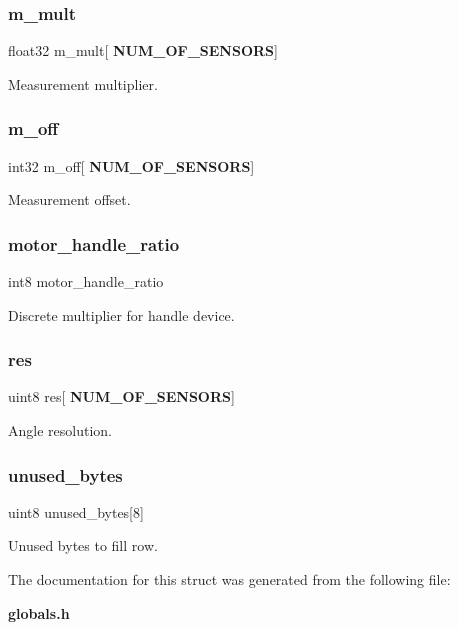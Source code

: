 \subsubsection{m\+\_\+mult}
{\footnotesize\ttfamily float32 m\+\_\+mult[\textbf{ N\+U\+M\+\_\+\+O\+F\+\_\+\+S\+E\+N\+S\+O\+RS}]}

Measurement multiplier. \mbox{\label{structst__encoder_ab544f035124be893918bafb611fe88d9}} 
\subsubsection{m\+\_\+off}
{\footnotesize\ttfamily int32 m\+\_\+off[\textbf{ N\+U\+M\+\_\+\+O\+F\+\_\+\+S\+E\+N\+S\+O\+RS}]}

Measurement offset. \mbox{\label{structst__encoder_a098badbb74d31ea6257e57f6d66823cc}} 
\subsubsection{motor\+\_\+handle\+\_\+ratio}
{\footnotesize\ttfamily int8 motor\+\_\+handle\+\_\+ratio}

Discrete multiplier for handle device. \mbox{\label{structst__encoder_ac2e19d167eac4c8ca9ce97c646e78595}} 
\subsubsection{res}
{\footnotesize\ttfamily uint8 res[\textbf{ N\+U\+M\+\_\+\+O\+F\+\_\+\+S\+E\+N\+S\+O\+RS}]}

Angle resolution. \mbox{\label{structst__encoder_ab2479545d632531da12aab41325a8d8f}} 
\subsubsection{unused\+\_\+bytes}
{\footnotesize\ttfamily uint8 unused\+\_\+bytes[8]}

Unused bytes to fill row. 

The documentation for this struct was generated from the following file\+:\begin{DoxyCompactItemize}
\item 
\textbf{ globals.\+h}\end{DoxyCompactItemize}
